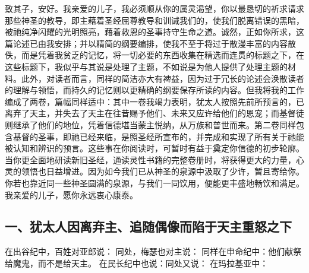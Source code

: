致其子，安好。我亲爱的儿子，我必须顺从你的属灵渴望，你以最恳切的祈求请求那些神圣的教导，即主藉着圣经屈尊教导和训诫我们的，使我们脱离错误的黑暗，被祂纯净闪耀的光明照亮，藉着救恩的圣事持守生命之道。诚然，正如你所求，这篇论述已由我安排；并以精简的纲要编排，使我不至于将过于散漫丰富的内容散佚，而是凭着我贫乏的记忆，将一切必要的东西收集在精选而连贯的标题之下，在这些标题下，我似乎与其说是处理了主题，不如说是为他人提供了处理主题的材料。此外，对读者而言，同样的简洁亦大有裨益，因为过于冗长的论述会涣散读者的理解与领悟，而持久的记忆则以更精确的纲要保存所读的内容。但我将我的工作编成了两卷，篇幅同样适中：其中一卷我竭力表明，犹太人按照先前所预言的，已离弃了天主，并失去了天主在往昔赐予他们、未来又应许给他们的恩宠；而基督徒则继承了他们的地位，凭着信德堪当蒙主悦纳，从万族和普世而来。第二卷同样包含基督的圣事，即祂已经来临，是照圣经所宣布的，并完成和实现了所有关于祂能被认知和辨识的预言。这些事在你阅读时，可暂时有益于奠定你信德的初步轮廓。当你更全面地研读新旧圣经，通读灵性书籍的完整卷册时，将获得更大的力量，心灵的领悟也日益增进。因为如今我们已从神圣的泉源中汲取了少许，暂且寄给你。你若也靠近同一些神圣圆满的泉源，与我们一同饮用，便能更丰盛地畅饮和满足。我亲爱的儿子，愿你永远衷心康泰。\par


\subsection{一、犹太人因离弃主、追随偶像而陷于天主重怒之下}

在出谷纪中，百姓对亚郎说： 同处，梅瑟也对主说： 同样在申命纪中：他们献祭给魔鬼，而不是给天主。 在民长纪中也说：同处又说： 在玛拉基亚中：\par

